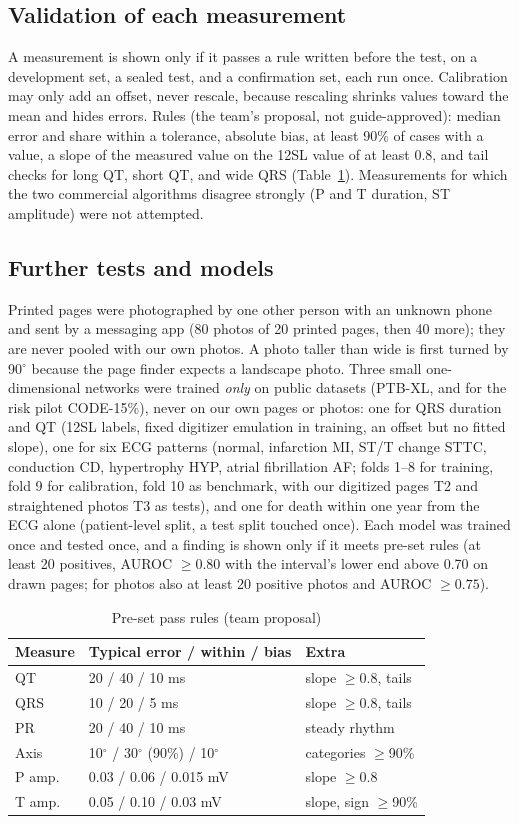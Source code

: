 \documentclass[conference]{IEEEtran}
\begin{document}
\subsection{Validation of each measurement}
A measurement is shown only if it passes a rule written before the test, on a development set, a sealed test, and a confirmation set, each run once. Calibration may only add an offset, never rescale, because rescaling shrinks values toward the mean and hides errors. Rules (the team's proposal, not guide-approved): median error and share within a tolerance, absolute bias, at least 90\% of cases with a value, a slope of the measured value on the 12SL value of at least 0.8, and tail checks for long QT, short QT, and wide QRS (Table~\ref{tab:rules}). Measurements for which the two commercial algorithms disagree strongly (P and T duration, ST amplitude) were not attempted.

\subsection{Further tests and models}
Printed pages were photographed by one other person with an unknown phone and sent by a messaging app (80 photos of 20 printed pages, then 40 more); they are never pooled with our own photos. A photo taller than wide is first turned by 90$^\circ$ because the page finder expects a landscape photo. Three small one-dimensional networks were trained \emph{only} on public datasets (PTB-XL, and for the risk pilot CODE-15\%), never on our own pages or photos: one for QRS duration and QT (12SL labels, fixed digitizer emulation in training, an offset but no fitted slope), one for six ECG patterns (normal, infarction MI, ST/T change STTC, conduction CD, hypertrophy HYP, atrial fibrillation AF; folds 1--8 for training, fold 9 for calibration, fold 10 as benchmark, with our digitized pages T2 and straightened photos T3 as tests), and one for death within one year from the ECG alone (patient-level split, a test split touched once). Each model was trained once and tested once, and a finding is shown only if it meets pre-set rules (at least 20 positives, AUROC $\ge0.80$ with the interval's lower end above 0.70 on drawn pages; for photos also at least 20 positive photos and AUROC $\ge0.75$).

\begin{table}[t]
\caption{Pre-set pass rules (team proposal)}
\label{tab:rules}
\centering
\small
\begin{tabular}{lll}
\toprule
Measure & Typical error / within / bias & Extra \\
\midrule
QT & 20 / 40 / 10 ms & slope $\ge$0.8, tails \\
QRS & 10 / 20 / 5 ms & slope $\ge$0.8, tails \\
PR & 20 / 40 / 10 ms & steady rhythm \\
Axis & 10$^\circ$ / 30$^\circ$ (90\%) / 10$^\circ$ & categories $\ge$90\% \\
P amp. & 0.03 / 0.06 / 0.015 mV & slope $\ge$0.8 \\
T amp. & 0.05 / 0.10 / 0.03 mV & slope, sign $\ge$90\% \\
\bottomrule
\end{tabular}
\end{table}
\end{document}
